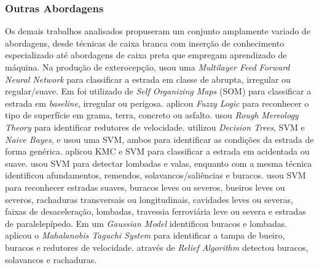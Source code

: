 \subsubsection{Outras Abordagens}

Os demais trabalhos analisados propuseram um conjunto amplamente variado de abordagens, desde técnicas de caixa branca com inserção de conhecimento especializado até abordagens de caixa preta que empregam aprendizado de máquina. Na produção de exterocepção, \cite{Jang2015} usou uma \textit{Multilayer Feed Forward Neural Network} para classificar a estrada em classe de abrupta, irregular ou regular/suave. Em \cite{Selmanaj2014} foi utilizado de \textit{Self Organizing Maps} (SOM) para classificar a estrada em \textit{baseline}, irregular ou perigosa. \cite{Khaleghian2017} aplicou \textit{Fuzzy Logic} para reconhecer o tipo de superfície em grama, terra, concreto ou asfalto. \cite{Fouad2014} usou \textit{Rough Mereology Theory} para identificar redutores de velocidade. \cite{Allouch2017} utilizou \textit{Decision Trees}, SVM e \textit{Naive Bayes}, e \cite{Singh2018} usou uma SVM, ambos para identificar as condições da estrada de forma genérica. \cite{Nalavde2015} aplicou KMC e SVM para classificar a estrada em acidentada ou suave. \cite{Savera2016} usou SVM para detectar lombadas e valas, enquanto \cite{Gueta2017} com a mesma técnica identificou afundamentos, remendos, solavancos/saliências e buracos. \cite{El-Wakeel2018} usou SVM para reconhecer estradas suaves, buracos leves ou severos, bueiros leves ou severos, rachaduras transversais ou longitudinais, cavidades leves ou severas, faixas de desaceleração, lombadas, travessia ferroviária leve ou severa e estradas de paralelepípedo. Em \cite{M.2017} um \textit{Gaussian Model} identificou buracos e lombadas. \cite{Wang2018} aplicou o \textit{Mahalanobis Taguchi System} para identificar a tampa de bueiro, buracos e redutores de velocidade. \cite{Wickramarathne2018} através de \textit{Relief Algorithm} detectou buracos, solavancos e rachaduras.

